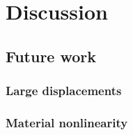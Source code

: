\section{Discussion}

\subsection{Future work}
\label{subsec:futureWork}

\subsubsection{Large displacements}

\subsubsection{Material nonlinearity}


\cleardoublepage
